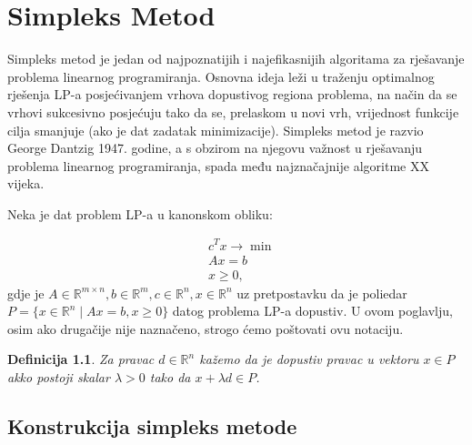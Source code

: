 \documentclass[a4paper, utf8, 11pt, colorlinks]{book}
\newtheorem{definition}{Definicija}
\begin{document}
\newpage 
\chapter{Simpleks Metod}

Simpleks metod je jedan od najpoznatijih i najefikasnijih algoritama za rješavanje problema linearnog programiranja. Osnovna ideja leži u traženju optimalnog rješenja LP-a posjećivanjem vrhova dopustivog regiona problema, na način da se vrhovi sukcesivno posjećuju tako da se, prelaskom u novi vrh, vrijednost funkcije cilja smanjuje (ako je dat zadatak minimizacije). Simpleks metod je razvio George Dantzig 1947. godine, a s obzirom na njegovu važnost u rješavanju problema linearnog programiranja, spada među najznačajnije algoritme XX vijeka.

Neka je dat problem LP-a u kanonskom obliku:

\begin{align}
    &c^Tx \rightarrow \min \nonumber \\ 
    & A x = b \nonumber \\
     & x \geq 0, \label{eq:lp_equality_constraint}
\end{align}
gdje je $A \in \mathbb{R}^{m \times n}, b \in \mathbb{R}^m, c \in \mathbb{R}^n, x\in \mathbb{R}^n$ uz pretpostavku da je poliedar $P=\{ x \in \mathbb{R}^n \mid A x = b , x \geq 0 \}$ datog problema LP-a dopustiv.  U ovom poglavlju, osim ako drugačije nije naznačeno, strogo ćemo poštovati ovu notaciju. 


\begin{definition}
      Za pravac $d\in \mathbb{R}^n$ kažemo da je dopustiv pravac u vektoru $x \in P$ akko postoji skalar $\lambda > 0$ tako da $x + \lambda d \in P$.
\end{definition}

\section{Konstrukcija simpleks metode}
\end{document}
